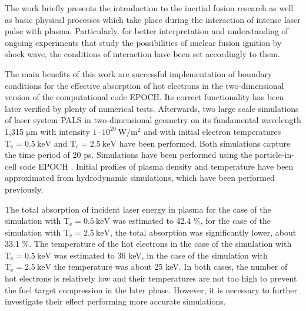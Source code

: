 The work briefly presents the introduction to the inertial fusion research as well as basic physical processes which take place during the interaction of intense laser pulse with plasma. Particularly, for better interpretation and understanding of ongoing experiments that study the possibilities of nuclear fusion ignition by shock wave, the conditions of interaction have been set accordingly to them.

The main benefits of this work are successful implementation of boundary conditions for the effective absorption of hot electrons in the two-dimensional version of the computational code EPOCH. Its correct functionality has been later verified by plenty of numerical tests. Afterwards, two large scale simulations of laser system PALS in two-dimensional geometry on its fundamental wavelength 1,315 $ \mathrm{\mu m} $ with intensity $ 1 \cdot 10^{20} \: \mathrm{W/m^2} $ and with initial electron temperatures $ \mathrm{T_e} = 0.5 \: \mathrm{keV} $ and $ \mathrm{T_e} = 2.5 \: \mathrm{keV} $ have been performed. Both simulations capture the time period of 20 ps. Simulations have been performed using the particle-in-cell code EPOCH \cite{bennett}. Initial profiles of plasma density and temperature have been approximated from hydrodynamic simulations, which have been performed previously.

The total absorption of incident laser energy in plasma for the case of the simulation with $ \mathrm{T_e} = 0.5 \: \mathrm{keV} $ was estimated to 42.4 \%, for the case of the simulation with $ \mathrm{T_e} = 2.5 \: \mathrm{keV} $, the total absorption was significantly lower, about 33.1 \%. The temperature of the hot electrons in the case of the simulation with $ \mathrm{T_e} = 0.5 \: \mathrm{keV} $ was estimated to 36 keV, in the case of the simulation with $ \mathrm{T_e} = 2.5 \: \mathrm{keV} $ the temperature was about 25 keV. In both cases, the number of hot electrons is relatively low and their temperatures are not too high to prevent the fuel target compression in the later phase. However, it is necessary to further investigate their effect performing more accurate simulations.

